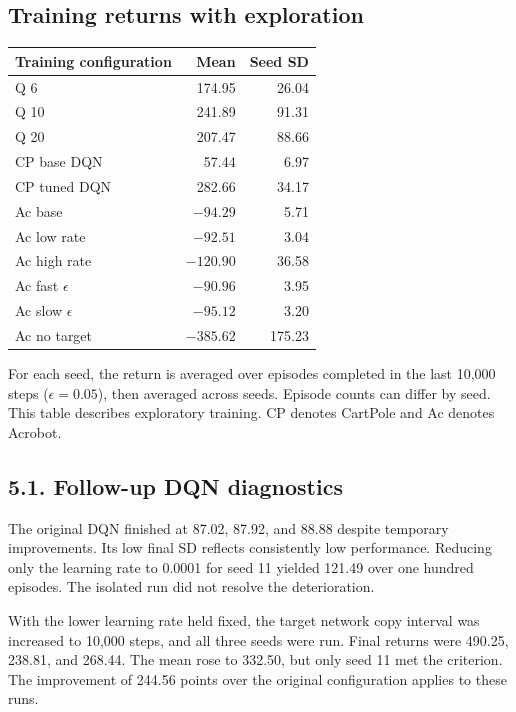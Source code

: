 \documentclass[10pt,a4paper,twocolumn]{extarticle}
\newenvironment{reporttable}
 {\par\noindent\begin{minipage}{\columnwidth}\small\renewcommand{\arraystretch}{1.13}}
 {\end{minipage}\par}
\begin{document}
\subsection*{Training returns with exploration}
\begin{reporttable}
\begin{tabularx}{\linewidth}{@{}Xrr@{}}
\toprule
Training configuration & Mean & Seed SD \\
\midrule
Q 6 & 174.95 & 26.04 \\
Q 10 & 241.89 & 91.31 \\
Q 20 & 207.47 & 88.66 \\
CP base DQN & 57.44 & 6.97 \\
CP tuned DQN & 282.66 & 34.17 \\
Ac base & $-94.29$ & 5.71 \\
Ac low rate & $-92.51$ & 3.04 \\
Ac high rate & $-120.90$ & 36.58 \\
Ac fast $\epsilon$ & $-90.96$ & 3.95 \\
Ac slow $\epsilon$ & $-95.12$ & 3.20 \\
Ac no target & $-385.62$ & 175.23 \\
\bottomrule
\end{tabularx}
\end{reporttable}
{\small For each seed, the return is averaged over episodes completed in the last 10,000 steps ($\epsilon=0.05$), then averaged across seeds. Episode counts can differ by seed. This table describes exploratory training. CP denotes CartPole and Ac denotes Acrobot.\par}

\newpage
\subsection*{5.1. Follow-up DQN diagnostics}
The original DQN finished at 87.02, 87.92, and 88.88 despite temporary improvements. Its low final SD reflects consistently low performance. Reducing only the learning rate to 0.0001 for seed 11 yielded 121.49 over one hundred episodes. The isolated run did not resolve the deterioration.

With the lower learning rate held fixed, the target network copy interval was increased to 10,000 steps, and all three seeds were run. Final returns were 490.25, 238.81, and 268.44. The mean rose to 332.50, but only seed 11 met the criterion. The improvement of 244.56 points over the original configuration applies to these runs.
\end{document}
